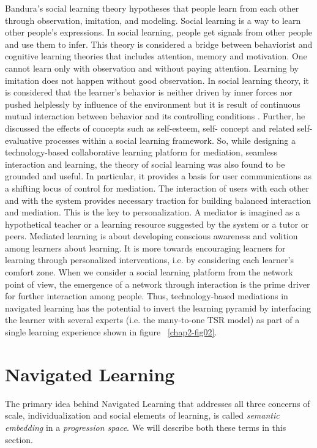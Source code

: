 \begin{multicols}{2}
Bandura’s \cite{art2-key06} social learning theory hypotheses that people learn from each other through observation, imitation, and modeling. Social learning is a way to learn other people’s expressions. In social learning, people get signals from other people and use them to infer. This theory is considered a bridge between behaviorist and cognitive learning theories that includes attention, memory and motivation. One cannot learn only with observation and without paying attention. Learning by imitation does not happen without good observation. In social learning theory, it is considered that the learner’s behavior is neither driven by inner forces nor pushed helplessly by influence of the environment but it is result of continuous mutual interaction between behavior and its controlling conditions \cite{art2-key06}. Further, he discussed the effects of concepts such as self-esteem, self- concept and related self-evaluative processes within a social learning framework. So, while designing a technology-based collaborative learning platform for mediation, seamless interaction and learning, the theory of social learning was also found to be grounded and useful. In particular, it provides a basis for user communications as a shifting locus of control for mediation. The interaction of users with each other and with the system provides necessary traction for building balanced interaction and mediation. This is the key to personalization. A mediator is imagined as a hypothetical teacher or a learning resource suggested by the system or a tutor or peers. Mediated learning is about developing conscious awareness and volition among learners about learning. It is more towards encouraging learners for learning through personalized interventions, i.e. by considering each learner’s comfort zone. When we consider a social learning platform from the network point of view, the emergence of a network through interaction is the prime driver for further interaction among people. Thus, technology-based mediations in navigated learning has the potential to invert the learning pyramid by interfacing the learner with several experts (i.e. the many-to-one TSR model) as part of a single learning experience shown in figure ~\ref{chap2-fig02}.

\section{Navigated Learning}

The primary idea behind Navigated Learning that addresses all three concerns of scale, individualization and social elements of learning, is called \textit{semantic embedding} in a \textit{progression space}. We will describe both these terms in this section.


\end{multicols}
